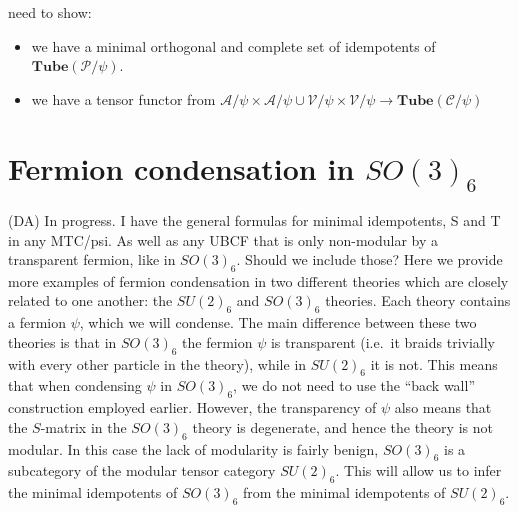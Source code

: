 \documentclass[12pt,a4paper]{article}
\newcounter{arrow}
\newcommand{\ra}{\rightarrow}
\newcommand{\mca}{\mathcal{A}}
\newcommand{\mcc}{\mathcal{C}}
\newcommand{\mcp}{\mathcal{P}}
\newcommand{\mcv}{\mathcal{V}}
\newcommand{\zt}{\mathbb{Z}_2}
\newcommand{\tube}{\textbf{Tube}}
\newcommand{\kw}[1]{{\color{kwcolor}\footnotesize{(KW) #1}}}
\newcommand{\dave}[1]{{\color{ao(english)}\footnotesize{(DA) #1}}}
\begin{document}
need to show:
\begin{itemize}
\item we have a minimal orthogonal and complete set of idempotents of $\tube(\mcp/\psi)$.
\item we have a tensor functor from $\mca/\psi \times \mca/\psi \cup \mcv / \psi \times \mcv /\psi \ra \tube(\mcc/\psi)$
\end{itemize}


\section{Fermion condensation in $SO(3)_6$} \label{so36}
\dave{In progress. I have the general formulas for minimal idempotents, S and T in any MTC/psi. 
As well as any UBCF that is only non-modular by a transparent fermion, like in $SO(3)_6$.
Should we include those?}
Here we provide more examples of fermion condensation in two different theories which are closely related to one another:
the $SU(2)_6$ and $SO(3)_6$ theories. 
Each theory contains a fermion $\psi$, which we will condense. 
The main difference between these two theories is that in $SO(3)_6$ the fermion $\psi$ is transparent (i.e.\ it braids trivially with every other particle in the theory), while in $SU(2)_6$ it is not. 
This means that when condensing $\psi$ in $SO(3)_6$, we do not need to use the ``back wall'' construction employed earlier. 
However, the transparency of $\psi$ also means that the $S$-matrix in the $SO(3)_6$ theory is degenerate, and hence the theory is not modular. 
In this case the lack of modularity is fairly benign, $SO(3)_6$ is a subcategory of the modular tensor category $SU(2)_6$.
This will allow us to infer the minimal idempotents of $SO(3)_6$ from the minimal idempotents of $SU(2)_6$.
\end{document}
